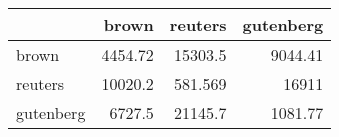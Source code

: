 \begin{tabular}{lrrr}
\hline
           &    brown &   reuters &   gutenberg \\
\hline
 brown     &  4454.72 & 15303.5   &     9044.41 \\
 reuters   & 10020.2  &   581.569 &    16911    \\
 gutenberg &  6727.5  & 21145.7   &     1081.77 \\
\hline
\end{tabular}